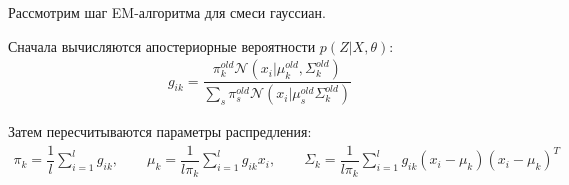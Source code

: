 \documentclass[12pt,fleqn]{article}
\begin{document}
\begin{vkProof}
Рассмотрим шаг EM-алгоритма для смеси гауссиан. 

Сначала вычисляются апостериорные вероятности $p(Z|X,\theta)$: 
\begin{gather*}
g_{ik} = \dfrac{\pi_k^{old} \mathcal{N}(x_i|\mu_{k}^{old}, \Sigma_{k}^{old})}{\sum\limits_{s}\pi_s^{old} \mathcal{N}(x_i|\mu_{s}^{old}\Sigma_{k}^{old})}
\end{gather*}

Затем пересчитываются параметры распредления:
\begin{gather*}
\pi_{k} = \dfrac{1}{l}\sum\limits_{i=1}^l g_{ik},\qquad 
\mu_{k} = \dfrac{1}{l\pi_k}\sum\limits_{i=1}^l g_{ik}x_i,\qquad 
\Sigma_k = \dfrac{1}{l\pi_k}\sum\limits_{i=1}^l g_{ik}(x_i - \mu_k)(x_i - \mu_k)^T
\end{gather*}


\end{vkProof}
\end{document}
